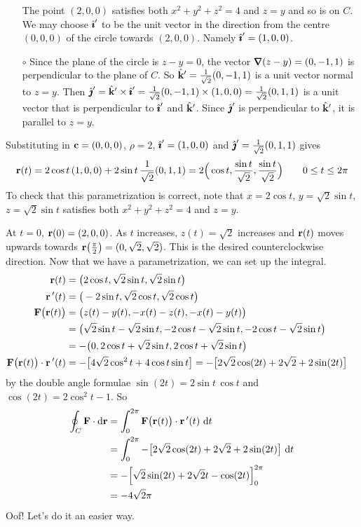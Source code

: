 \begin{eg}
\begin{itemize}
     The point $(2,0,0)$ satisfies both  $x^2+y^2+z^2=4$ and $z=y$ and 
     so is on $C$. We may choose $\hat{\pmb{\imath}}'$ to be the unit vector in the 
     direction from the centre $(0,0,0)$ of the circle towards $(2,0,0)$. 
     Namely $\hat{\pmb{\imath}}'=(1,0,0)$. 
     \item[$\circ$]
     Since the plane of the circle is $z-y=0$, the 
     vector $\vnabla(z-y)=(0,-1,1)$ is perpendicular to the plane of 
     $C$. So  $\hat{\mathbf{k}}'=\frac{1}{\sqrt{2}}(0,-1,1)$ is a unit vector normal 
     to $z=y$. Then 
      $\hat{\pmb{\jmath}}'=\hat{\mathbf{k}}'\times\hat{\pmb{\imath}}'=\frac{1}{\sqrt{2}}(0,-1,1)\times(1,0,0)
      =\frac{1}{\sqrt{2}}(0,1,1)$ is a unit vector that is 
      perpendicular to $\hat{\pmb{\imath}}'$ and $\hat{\mathbf{k}}'$.
     Since $\hat{\pmb{\jmath}}'$ is perpendicular to $\hat{\mathbf{k}}'$, it is parallel to $z=y$.
     \end{itemize}
Substituting in $\mathbf{c}=(0,0,0)$, $\rho=2$, $\hat{\pmb{\imath}}'=(1,0,0)$ and 
$\hat{\pmb{\jmath}}'=\frac{1}{\sqrt{2}}(0,1,1)$ gives
\begin{equation*}
\mathbf{r}(t)=2\cos t\,(1,0,0)+ 2\sin t\,\frac{1}{\sqrt{2}}(0,1,1)
=2\Big(\cos t, \frac{\sin t}{\sqrt{2}},\frac{\sin t}{\sqrt{2}}\Big)
\qquad 0\le t\le 2\pi
\end{equation*}
To check that this parametrization is correct, note that 
$x=2\cos t$, $y=\sqrt{2}\sin t$, $z=\sqrt{2}\sin t$ satisfies both 
$x^2+y^2+z^2=4$ and $z=y$. 

At $t=0$, $\mathbf{r}(0)=(2,0,0)$. As $t$ increases,
$z(t)=\sqrt{2}$ increases and $\mathbf{r}(t)$ moves upwards towards 
$\mathbf{r}\big(\frac{\pi}{2}\big)=(0,\sqrt{2},\sqrt{2})$.
This is the desired counterclockwise direction. Now that we have a 
parametrization, we can set up the integral.
\begin{align*}
\mathbf{r}(t)&=\big(2\cos t, \sqrt{2}\sin t,\sqrt{2}\sin t\big)\cr
\mathbf{r}\,'(t)&=\big(-2\sin t,\sqrt{2}\cos t,\sqrt{2}\cos t\big)\cr
\mathbf{F}\big(\mathbf{r}(t)\big)&=\big(z(t)-y(t),-x(t)-z(t),-x(t)-y(t)\big)\cr
&=\big(\sqrt{2}\sin t-\sqrt{2}\sin t,
              -2\cos t-\sqrt{2}\sin t,-2\cos t-\sqrt{2}\sin t\big)\cr
&=-\big(0, 2\cos t+\sqrt{2}\sin t,2\cos t+\sqrt{2}\sin t\big)\cr
\mathbf{F}\big(\mathbf{r}(t)\big)\cdot \mathbf{r}\,'(t)
&=-\big[4\sqrt{2}\cos^2 t+4\cos t\sin t\big]
=-\big[2\sqrt{2}\cos(2t)+2\sqrt{2}+2\sin(2t)\big]
\end{align*}
by the double angle formulae $\sin(2t)=2\sin t\,\cos t$ and
$\cos(2t) = 2\cos^2t-1$. So
\begin{align*}
\oint_C\vF\cdot \dee{\vr}
&=\int_0^{2\pi}\vF\big(\vr(t)\big)\cdot \vr\,'(t)\ \dee{t}\\
&=\int_0^{2\pi}-\big[2\sqrt{2}\cos(2t)+2\sqrt{2}+2\sin(2t)\big]\ \dee{t}\\
&=-\Big[\sqrt{2}\sin(2t)+2\sqrt{2}t-\cos(2t)\Big]_0^{2\pi}\\
&=-4\sqrt{2}\pi
\end{align*}
Oof! Let's do it an easier way.


\end{eg}
